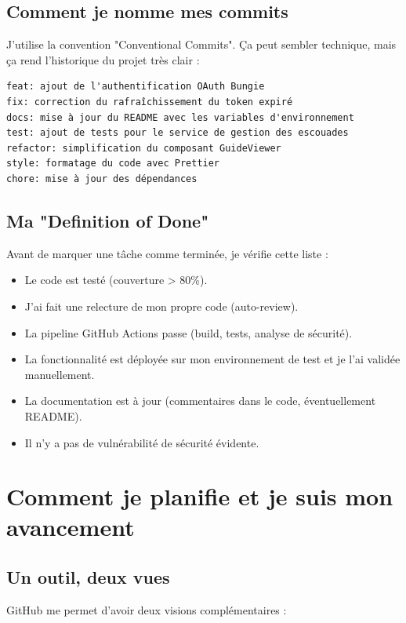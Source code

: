 \subsection{Comment je nomme mes commits}

J'utilise la convention "Conventional Commits". Ça peut sembler technique, mais ça rend l'historique du projet très clair :

\begin{lstlisting}
feat: ajout de l'authentification OAuth Bungie
fix: correction du rafraîchissement du token expiré
docs: mise à jour du README avec les variables d'environnement
test: ajout de tests pour le service de gestion des escouades
refactor: simplification du composant GuideViewer
style: formatage du code avec Prettier
chore: mise à jour des dépendances
\end{lstlisting}

\subsection{Ma "Definition of Done"}

Avant de marquer une tâche comme terminée, je vérifie cette liste :

\begin{itemize}
    \item Le code est testé (couverture > 80\%).
    \item J'ai fait une relecture de mon propre code (auto-review).
    \item La pipeline GitHub Actions passe (build, tests, analyse de sécurité).
    \item La fonctionnalité est déployée sur mon environnement de test et je l'ai validée manuellement.
    \item La documentation est à jour (commentaires dans le code, éventuellement README).
    \item Il n'y a pas de vulnérabilité de sécurité évidente.
\end{itemize}

\section{Comment je planifie et je suis mon avancement}

\subsection{Un outil, deux vues}

GitHub me permet d'avoir deux visions complémentaires :

